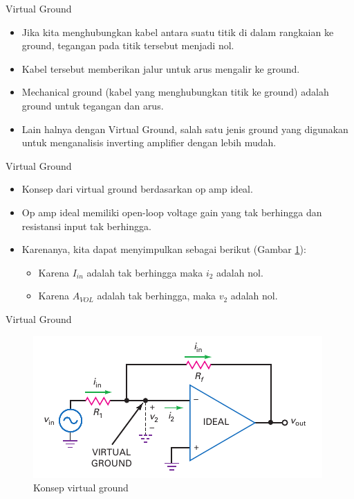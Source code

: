 \begin{frame}[t]{Virtual Ground}
	\begin{itemize}
		\item Jika kita menghubungkan kabel antara suatu titik di dalam rangkaian ke ground, tegangan pada titik tersebut menjadi nol.
		\item Kabel tersebut memberikan jalur untuk arus mengalir ke ground.
		\item Mechanical ground (kabel yang menghubungkan titik ke ground) adalah ground untuk tegangan dan arus.
		\item Lain halnya dengan Virtual Ground, salah satu jenis ground yang digunakan untuk menganalisis inverting amplifier dengan lebih mudah.
	\end{itemize}
\end{frame}

\begin{frame}[t]{Virtual Ground}
	\begin{itemize}
		\item Konsep dari virtual ground berdasarkan op amp ideal.
		\item Op amp ideal memiliki open-loop voltage gain yang tak berhingga dan resistansi input tak berhingga.
		\item Karenanya, kita dapat menyimpulkan sebagai berikut (Gambar \ref{fig-16.13}):
		\begin{itemize}
			\item Karena $ I_{in} $ adalah tak berhingga maka $ i_2 $ adalah nol.
			\item Karena $ A_{VOL} $ adalah tak berhingga, maka $ v_2 $ adalah nol.
		\end{itemize}
	\end{itemize}
\end{frame}

\begin{frame}[t]{Virtual Ground}
	\begin{figure}
		\centering
		\includegraphics[height=0.7\textheight]{gambar/fig-16.13}
		\caption{Konsep virtual ground}
		\label{fig-16.13}
	\end{figure}
\end{frame}

